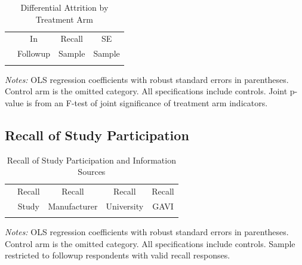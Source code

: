 \documentclass[11pt]{article}
\begin{document}
\begin{table}[H]
\caption{Differential Attrition by Treatment Arm}
\label{tab:persistence_attrition}
\centering
\begin{tabular}{lccc}
\toprule
& In & Recall & SE \\
& Followup & Sample & Sample \\
\midrule

\\
\bottomrule
\end{tabular}
\begin{minipage}{\textwidth}
\vspace{0.5em}
\footnotesize
\textit{Notes:} OLS regression coefficients with robust standard errors in parentheses. Control arm is the omitted category. All specifications include controls. Joint p-value is from an F-test of joint significance of treatment arm indicators.
\end{minipage}
\end{table}

\subsection{Recall of Study Participation}

\begin{table}[H]
\caption{Recall of Study Participation and Information Sources}
\label{tab:persistence_recall}
\centering
\begin{tabular}{lcccc}
\toprule
& Recall & Recall & Recall & Recall \\
& Study & Manufacturer & University & GAVI \\
\midrule

\\
\bottomrule
\end{tabular}
\begin{minipage}{\textwidth}
\vspace{0.5em}
\footnotesize
\textit{Notes:} OLS regression coefficients with robust standard errors in parentheses. Control arm is the omitted category. All specifications include controls. Sample restricted to followup respondents with valid recall responses.
\end{minipage}
\end{table}

\end{document}
